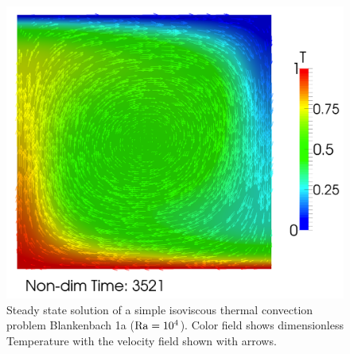 \begin{figure}[htbp!]
  \centering
  \includegraphics[width=.7\textwidth]{figures/convection_Tv.png}
  \caption{Steady state solution of a simple isoviscous thermal
    convection problem Blankenbach 1a
    \cite{blankenbach_benchmark_1989} ($\mathrm{Ra}=10^{4}$). Color field
    shows dimensionless Temperature with the velocity field shown with
    arrows.}
  \label{fig:convection1a}
\end{figure}

\pagebreak{}

